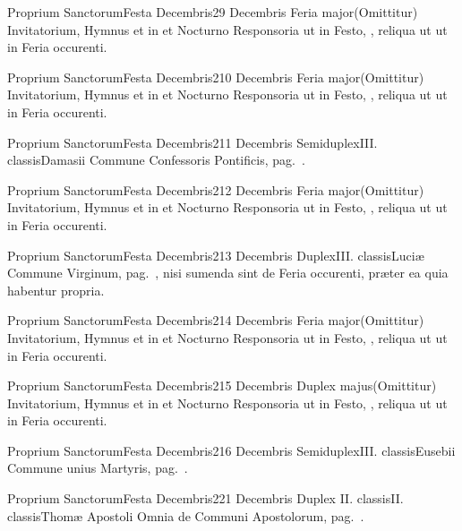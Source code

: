 \documentclass[nocturnale-romanum.tex]{subfiles}
\begin{document}
	{Proprium Sanctorum}{Festa Decembris}{2}{9 Decembris}
	{Feria major}{(Omittitur)}{}
	{Invitatorium, Hymnus et in  et  Nocturno Responsoria ut in Festo, \pageref{M-1208}, reliqua ut ut in Feria occurenti.}
	{}

	{Proprium Sanctorum}{Festa Decembris}{2}{10 Decembris}
	{Feria major}{(Omittitur)}{}
	{Invitatorium, Hymnus et in  et  Nocturno Responsoria ut in Festo, \pageref{M-1208}, reliqua ut ut in Feria occurenti.}
	{}

	{Proprium Sanctorum}{Festa Decembris}{2}{11 Decembris}
	{Semiduplex}{III. classis}{Damasii}
	{Commune Confessoris Pontificis, pag.\ \pageref{M-COPO}.}
	{}

	{Proprium Sanctorum}{Festa Decembris}{2}{12 Decembris}
	{Feria major}{(Omittitur)}{}
	{Invitatorium, Hymnus et in  et  Nocturno Responsoria ut in Festo, \pageref{M-1208}, reliqua ut ut in Feria occurenti.}
	{}

	{Proprium Sanctorum}{Festa Decembris}{2}{13 Decembris}
	{Duplex}{III. classis}{Luciæ}
	{Commune Virginum, pag.\ \pageref{M-MU}, nisi sumenda sint de Feria occurenti, præter ea quia habentur propria.}
	{}

	{Proprium Sanctorum}{Festa Decembris}{2}{14 Decembris}
	{Feria major}{(Omittitur)}{}
	{Invitatorium, Hymnus et in  et  Nocturno Responsoria ut in Festo, \pageref{M-1208}, reliqua ut ut in Feria occurenti.}
	{}

	{Proprium Sanctorum}{Festa Decembris}{2}{15 Decembris}
	{Duplex majus}{(Omittitur)}{}
	{Invitatorium, Hymnus et in  et  Nocturno Responsoria ut in Festo, \pageref{M-1208}, reliqua ut ut in Feria occurenti.}
	{}

	{Proprium Sanctorum}{Festa Decembris}{2}{16 Decembris}
	{Semiduplex}{III. classis}{Eusebii}
	{Commune unius Martyris, pag.\ \pageref{M-UMEX}.}
	{}

	{Proprium Sanctorum}{Festa Decembris}{2}{21 Decembris}
	{Duplex II. classis}{II. classis}{Thomæ Apostoli}
	{Omnia de Communi Apostolorum, pag.\ \pageref{M-APEX}.}
	{}
	
\end{document}
